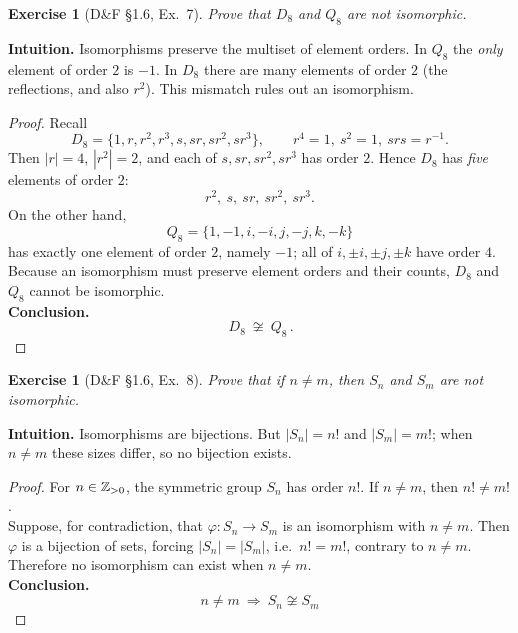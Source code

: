 \documentclass[12pt]{article}
\newtheorem{exercise}[theorem]{Exercise}
\theoremstyle{definition}
\begin{document}
\newpage

\begin{exercise}[D\&F §1.6, Ex.~7]
Prove that $D_8$ and $Q_8$ are not isomorphic.
\end{exercise}

\dotfill

\noindent\textbf{Intuition.}
Isomorphisms preserve the multiset of element orders. In $Q_8$ the \emph{only} element of order $2$ is $-1$. In $D_8$ there are many elements of order $2$ (the reflections, and also $r^2$). This mismatch rules out an isomorphism.\\

\dotfill

\begin{proof}
\noindent Recall
\[
D_8=\{1,r,r^2,r^3,s,sr,sr^2,sr^3\},\qquad r^4=1,\ s^2=1,\ srs=r^{-1}.
\]
Then $|r|=4$, $|r^2|=2$, and each of $s,sr,sr^2,sr^3$ has order $2$. Hence $D_8$ has \emph{five} elements of order $2$:
\[
r^2,\ s,\ sr,\ sr^2,\ sr^3.
\]
On the other hand,
\[
Q_8=\{1,-1,i,-i,j,-j,k,-k\}
\]
has exactly one element of order $2$, namely $-1$; all of $i,\pm i,\pm j,\pm k$ have order $4$.\\

\noindent Because an isomorphism must preserve element orders and their counts, $D_8$ and $Q_8$ cannot be isomorphic.\\

\noindent\textbf{Conclusion.}
\[
\boxed{\,D_8\ \not\cong\ Q_8\,}.
\]
\end{proof}

\newpage

\begin{exercise}[D\&F §1.6, Ex.~8]
Prove that if $n\ne m$, then $S_n$ and $S_m$ are not isomorphic.
\end{exercise}

\dotfill

\noindent\textbf{Intuition.}
Isomorphisms are bijections. But $|S_n|=n!$ and $|S_m|=m!$; when $n\ne m$ these sizes differ, so no bijection exists.\\

\dotfill

\begin{proof}
\noindent For $n\in\Bbb Z_{>0}$, the symmetric group $S_n$ has order $n!$. If $n\ne m$, then $n!\ne m!$.\\

\noindent Suppose, for contradiction, that $\varphi:S_n\to S_m$ is an isomorphism with $n\ne m$. Then $\varphi$ is a bijection of sets, forcing $|S_n|=|S_m|$, i.e.\ $n!=m!$, contrary to $n\ne m$.\\

\noindent Therefore no isomorphism can exist when $n\ne m$.\\

\noindent\textbf{Conclusion.}
\[
\boxed{\,n\ne m\ \Longrightarrow\ S_n\not\cong S_m\,}
\]
\end{proof}
\end{document}
